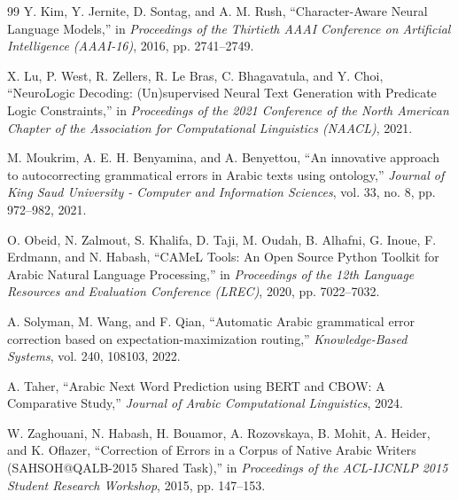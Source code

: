 \documentclass{article}
\begin{document}
\begin{thebibliography}{99}
Y. Kim, Y. Jernite, D. Sontag, and A. M. Rush,
``Character-Aware Neural Language Models,''
in \textit{Proceedings of the Thirtieth AAAI Conference on Artificial Intelligence (AAAI-16)}, 2016, pp. 2741–2749.

X. Lu, P. West, R. Zellers, R. Le Bras, C. Bhagavatula, and Y. Choi,
``NeuroLogic Decoding: (Un)supervised Neural Text Generation with Predicate Logic Constraints,''
in \textit{Proceedings of the 2021 Conference of the North American Chapter of the Association for Computational Linguistics (NAACL)}, 2021.

M. Moukrim, A. E. H. Benyamina, and A. Benyettou, 
``An innovative approach to autocorrecting grammatical errors in Arabic texts using ontology,'' 
\textit{Journal of King Saud University - Computer and Information Sciences}, vol. 33, no. 8, pp. 972–982, 2021.

O. Obeid, N. Zalmout, S. Khalifa, D. Taji, M. Oudah, B. Alhafni, G. Inoue, F. Erdmann, and N. Habash, 
``CAMeL Tools: An Open Source Python Toolkit for Arabic Natural Language Processing,'' 
in \textit{Proceedings of the 12th Language Resources and Evaluation Conference (LREC)}, 2020, pp. 7022–7032.

A. Solyman, M. Wang, and F. Qian, 
``Automatic Arabic grammatical error correction based on expectation-maximization routing,'' 
\textit{Knowledge-Based Systems}, vol. 240, 108103, 2022.

A. Taher,
``Arabic Next Word Prediction using BERT and CBOW: A Comparative Study,''
\textit{Journal of Arabic Computational Linguistics}, 2024.

W. Zaghouani, N. Habash, H. Bouamor, A. Rozovskaya, B. Mohit, A. Heider, and K. Oflazer, 
``Correction of Errors in a Corpus of Native Arabic Writers (SAHSOH@QALB-2015 Shared Task),'' 
in \textit{Proceedings of the ACL-IJCNLP 2015 Student Research Workshop}, 2015, pp. 147–153.

\end{thebibliography}
\end{document}
